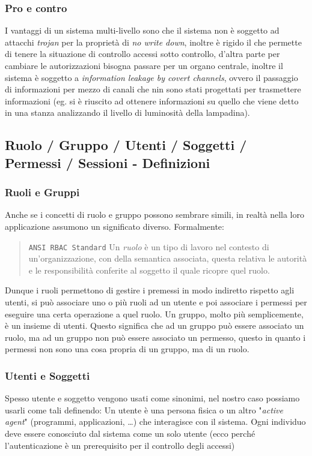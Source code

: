         \subsubsection{Pro e contro}
            I vantaggi di un sistema multi-livello sono che il sistema non è soggetto ad attacchi \textit{trojan} per la proprietà di \textit{no write down}, inoltre è rigido il che permette di tenere la situazione di controllo accessi sotto controllo, d'altra parte per cambiare le autorizzazioni bisogna passare per un organo centrale, inoltre il sistema è soggetto a \textit{information leakage by covert channels}, ovvero il passaggio di informazioni per mezzo di canali che nin sono stati progettati per trasmettere informazioni (eg. si è riuscito ad ottenere informazioni su quello che viene detto in una stanza analizzando il livello di luminosità della lampadina).
    \subsection{Ruolo / Gruppo / Utenti / Soggetti / Permessi / Sessioni - Definizioni}
        \subsubsection{Ruoli e Gruppi}
            Anche se i concetti di ruolo e gruppo possono sembrare simili, in realtà nella loro applicazione assumono un significato diverso. Formalmente:
            \begin{quote}{\texttt{ANSI RBAC Standard}}
                Un \textit{ruolo} è un tipo di lavoro nel contesto di un'organizzazione, con della semantica associata, questa relativa le autorità e le responsibilità conferite al soggetto il quale ricopre quel ruolo.
            \end{quote}
            Dunque i ruoli permettono di gestire i premessi in modo indiretto rispetto agli utenti, si può associare uno o più ruoli ad un utente e poi associare i permessi per eseguire una certa operazione a quel ruolo.\newline
            Un gruppo, molto più semplicemente, è un insieme di utenti.\newline
            Questo significa che ad un gruppo può essere associato un ruolo, ma ad un gruppo non può essere associato un permesso, questo in quanto i permessi non sono una cosa propria di un gruppo, ma di un ruolo.
        \subsubsection{Utenti e Soggetti}
            Spesso utente e soggetto vengono usati come sinonimi, nel nostro caso possiamo usarli come tali definendo:\newline
            Un utente è una persona fisica o un altro "\textit{active agent}" (programmi, applicazioni, \dots) che interagisce con il sistema. Ogni individuo deve essere conosciuto dal sistema come un solo utente (ecco perché l'autenticazione è un prerequisito per il controllo degli accessi)
